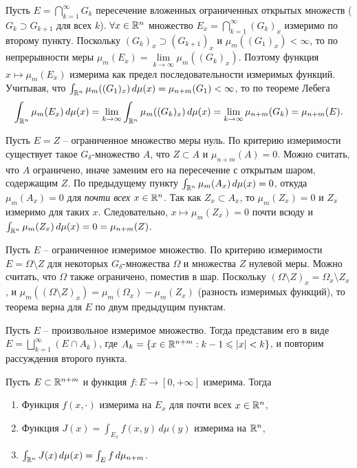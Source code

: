 \begin{myproof}
	\vspace{5pt}
	Пусть $E = \bigcap \limits_{k=1}^{\infty} G_k$ пересечение вложенных ограниченных открытых множеств ($G_k \supset G_{k+1}$ для всех $k$).
	$\forall x \in \mathbb{R}^n$ множество $E_x = \bigcap \limits_{k=1}^{\infty} (G_k)_x$ измеримо по второму пункту.
	Поскольку $(G_k)_x \supset (G_{k+1})_x$ и $\mu_m((G_1)_x) < \infty$, то по непрерывности меры 
	$\mu_m(E_x) = \lim \limits_{k \to \infty} \mu_m((G_k)_x)$. 
	Поэтому функция $x \mapsto \mu_m(E_x)$ измерима как предел последовательности измеримых функций. 
	Учитывая, что $\int_{\mathbb{R}^n} \mu_m ((G_1)_x) \, d\mu(x) = \mu_{n+m} (G_1) < \infty$, то по теореме Лебега 
	\[ \int_{\mathbb{R}^n} \mu_m(E_x) \, d\mu(x) = \lim \limits_{k \to \infty} \int_{\mathbb{R}^n} \mu_m ((G_k)_x) \, d\mu(x) = \lim \limits_{k \to \infty} \mu_{n+m} (G_k) = \mu_{n+m} (E). \]

	\vspace{5pt}
	Пусть $E = Z$ -- ограниченное множество меры нуль. По критерию измеримости существует такое 
	$G_{\delta}$-множество $A$, что $Z \subset A$ и $\mu_{n+m}(A) = 0$.
	Можно считать, что $A$ ограничено, иначе заменим его на пересечение с открытым шаром, содержащим $Z$. 
	По предыдущему пункту $\int_{\mathbb{R}^n} \mu_m (A_x) \, d\mu(x) = 0$, откуда $\mu_m (A_x) = 0$ для \textit{почти всех} $x \in \mathbb{R}^n$.
	Так как $Z_x \subset A_x$, то $\mu_m(Z_x) = 0$ и $Z_x$ измеримо для таких $x$. 
	Следовательно, $x \mapsto \mu_m(Z_x) = 0$ почти всюду и $\int_{\mathbb{R}^n} \mu_m(Z_x) \, d\mu(x) = 0 = \mu_{n+m}(Z)$.
	
	\vspace{5pt}
	Пусть $E$ -- ограниченное измеримое множество. По критерию измеримости $E = \Omega \setminus Z$ для некоторых $G_{\delta}$-множества $\Omega$ и множества $Z$ нулевой меры. 
	Можно считать, что $\Omega$ также ограничено, поместив в шар.
	Поскольку $(\Omega \setminus Z)_x = \Omega_x \setminus Z_x$, и $\mu_m((\Omega \setminus Z)_x) = \mu_m (\Omega_x) - \mu_m(Z_x)$ (разность измеримых функций), то теорема верна для $E$ по двум предыдущим пунктам.

	\vspace{5pt}
	Пусть $E$ -- произвольное измеримое множество. Тогда представим его в виде $E = \bigsqcup \limits_{k=1}^{\infty} (E \cap A_k)$, где $A_k = \{x \in \mathbb{R}^{n+m} : k-1 \leqslant |x| < k\}$, и повторим рассуждения второго пункта.
\end{myproof}

\begin{theorem}
	Пусть $E \subset \mathbb{R}^{n+m}$ и функция $f : E \to [0, +\infty]$ измерима. Тогда 
	\begin{enumerate}[itemsep = 0pt, topsep = 5pt]
		\item Функция $f(x, \cdot)$ измерима на $E_x$ для почти всех $x \in \mathbb{R}^n$,
		\item Функция $J(x) = \int_{E_x} f(x, y) \, d\mu(y)$ измерима на $\mathbb{R}^n$, 
		\item $\int_{\mathbb{R}^n} J(x) \, d\mu(x) = \int_{E} f \, d\mu_{n+m}$.
	\end{enumerate}
\end{theorem}

